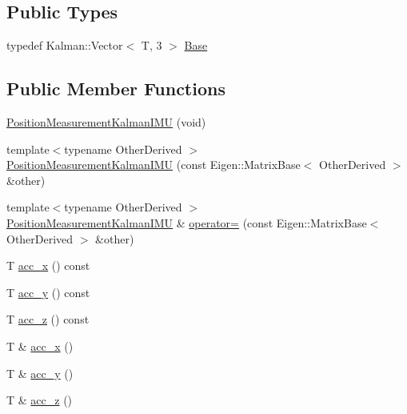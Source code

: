 \subsection*{Public Types}
\begin{DoxyCompactItemize}
\item 
typedef Kalman\+::\+Vector$<$ T, 3 $>$ \hyperlink{classo_cpt_1_1components_1_1sensors_1_1_position_measurement_kalman_i_m_u_a1ffa7980ab41c0fffeee43e28284b1cd}{Base}
\end{DoxyCompactItemize}
\subsection*{Public Member Functions}
\begin{DoxyCompactItemize}
\item 
\hyperlink{classo_cpt_1_1components_1_1sensors_1_1_position_measurement_kalman_i_m_u_acb44fed74fc170215d2ce0b872b1b06b}{Position\+Measurement\+Kalman\+I\+MU} (void)
\item 
{\footnotesize template$<$typename Other\+Derived $>$ }\\\hyperlink{classo_cpt_1_1components_1_1sensors_1_1_position_measurement_kalman_i_m_u_aa5200169110c4126060838f9dc799723}{Position\+Measurement\+Kalman\+I\+MU} (const Eigen\+::\+Matrix\+Base$<$ Other\+Derived $>$ \&other)
\item 
{\footnotesize template$<$typename Other\+Derived $>$ }\\\hyperlink{classo_cpt_1_1components_1_1sensors_1_1_position_measurement_kalman_i_m_u}{Position\+Measurement\+Kalman\+I\+MU} \& \hyperlink{classo_cpt_1_1components_1_1sensors_1_1_position_measurement_kalman_i_m_u_a892171bfafe1c96187cce941badca9e2}{operator=} (const Eigen\+::\+Matrix\+Base$<$ Other\+Derived $>$ \&other)
\item 
T \hyperlink{classo_cpt_1_1components_1_1sensors_1_1_position_measurement_kalman_i_m_u_a511c5c331629625c81e3c4e81ecd9128}{acc\+\_\+x} () const
\item 
T \hyperlink{classo_cpt_1_1components_1_1sensors_1_1_position_measurement_kalman_i_m_u_abbd04b0e58d5041e2f69f79ccdd09b69}{acc\+\_\+y} () const
\item 
T \hyperlink{classo_cpt_1_1components_1_1sensors_1_1_position_measurement_kalman_i_m_u_a63dd831aac6136f1e55b373b3b7046c1}{acc\+\_\+z} () const
\item 
T \& \hyperlink{classo_cpt_1_1components_1_1sensors_1_1_position_measurement_kalman_i_m_u_a9a2401716413c2c33aca9992ceb7a78f}{acc\+\_\+x} ()
\item 
T \& \hyperlink{classo_cpt_1_1components_1_1sensors_1_1_position_measurement_kalman_i_m_u_abbc0b3a7bebedbf7fcd4caad7cd57694}{acc\+\_\+y} ()
\item 
T \& \hyperlink{classo_cpt_1_1components_1_1sensors_1_1_position_measurement_kalman_i_m_u_a6637e65f5cbc67517e1b0832663555ea}{acc\+\_\+z} ()
\end{DoxyCompactItemize}
